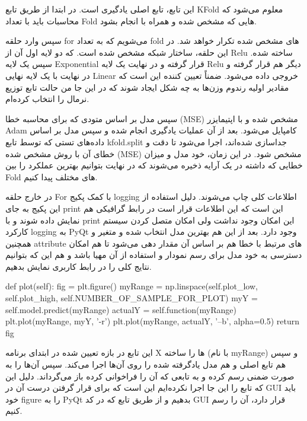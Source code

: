 \documentclass[12pt,titlepage,a4page , tikz , multi,table , svgnames,xcdraw]{article}
\begin{document}
این تابع، تابع اصلی یادگیری است. در ابتدا از طریق تابع KFold معلوم می‌شود که محاسبات باید با تعداد Fold هایی که مشخص شده و همراه با  انجام بشود.

سپس وارد حلقه for می‌شویم که به تعداد fold های مشخص شده تکرار خواهد شد. در این حلقه، ساختار شبکه مشخص شده است. که دو لایه اول آن از Relu ساخته شده. سپس یک لایه Exponential قرار گرفته و در نهایت یک لایه Relu دیگر هم قرار گرفته و در نهایت با یک لایه نهایی Linear خروجی داده می‌شود. ضمناً  تعیین کننده این است که مقادیر اولیه رندوم وزن‌ها به چه شکل ایجاد شوند که در این جا من حالت تابع توزیع نرمال را انتخاب کرده‌ام.



سپس مدل بر اساس متودی که برای محاسبه خطا (MSE) مشخص شده و با اپتیمایزر Adam کامپایل می‌شود. بعد از آن عملیات یادگیری انجام شده و سپس مدل بر اساس داده‌های تستی که توسط تابع kfold.split جداسازی شده‌اند، اجرا می‌شود تا دقت و خطای آن با روش مشخص شده (MSE) مشخص شود. در این زمان، خود مدل و میزان خطایی که داشته در یک آرایه ذخیره می‌شوند که در نهایت بتوانیم بهترین عملکرد را بین Fold های مختلف پیدا کنیم.

در خارج حلقه For با کمک پکیج logging اطلاعات کلی چاپ می‌شوند. دلیل استفاده از این پکیج به جای print این است که این اطلاعات قرار است در رابط گرافیکی هم نمایش داده شوند و با print این امکان وجود نداشت ولی امکان متصل کردن سیستم کارکرد logging به PyQt وجود دارد.
بعد از این هم بهترین مدل انتخاب شده و متغیر 
و همچنین attribute های مرتبط با خطا هم بر اساس آن مقدار دهی می‌شود تا هم امکان دسترسی به خود مدل برای رسم نمودار و استفاده از آن مهیا باشد و هم این که بتوانیم نتایج کلی را در رابط کاربری نمایش بدهیم.





\begin{latin}
\begin{python}[language=Python]

  def plot(self):
        fig = plt.figure()
        myRange = np.linspace(self.plot_low, self.plot_high, self.NUMBER_OF_SAMPLE_FOR_PLOT)
        myY = self.model.predict(myRange)
        actualY = self.function(myRange)
        plt.plot(myRange, myY, '-r')
        plt.plot(myRange, actualY, '--b', alpha=0.5)
        return fig
\end{python}

\end{latin}

این تابع در بازه تعیین شده در ابتدای برنامه X ها را ساخته (با نام myRange) و سپس هم تابع اصلی و هم مدل یادگرفته شده را روی آن‌ها اجرا می‌کند. سپس آن‌ها را به صورت ضمنی رسم کرده و به تابعی که آن را فراخوانی کرده باز می‌گرداند. دلیل این که تابع  را این جا اجرا نکرده‌ایم این است که برای قرار گرفتن درست آن در GUI باید خود figure را به PyQt بدهیم و از طریق تابع  که در کد GUI قرار دارد، آن را رسم کنیم.
\end{document}
